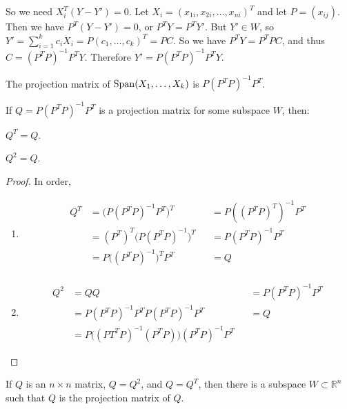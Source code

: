 \documentclass[../main.tex]{subfiles}
\begin{document}
%
{
So we need $X_i^T(Y-Y') = 0$. Let $X_i = (x_{1i},x_{2i},\hdots, x_{ni})^{T}$ and let $P = (x_{ij})$. Then we have $P^T(Y-Y') = 0$, or $P^TY = P^T Y'$. But $Y'\in W$, so $Y' = \sum_{i=1}^{k} c_i X_i = P(c_1,\hdots, c_k)^T = PC$. So we have $P^TY = P^TPC$, and thus $C = (P^TP)^{-1}P^TY$. Therefore $Y'=P(P^TP)^{-1}P^T Y$.
}
%
\begin{definition}
The projection matrix of $\operatorname{Span}(X_{1},\hdots,X_{k})$ is $P(P^TP)^{-1}P^T$.
\end{definition}
%
\begin{theorem}
If $Q = P(P^TP)^{-1}P^T$ is a projection matrix for some subspace $W$, then:
\begin{enumerate}
    \begin{multicols}{2}
        \item $Q^T =Q$.
        \item $Q^2 = Q$.
    \end{multicols}
\end{enumerate}
\end{theorem}
\begin{proof}
In order,
\begin{enumerate}
\item   \begin{align*}
            Q^T &= \big(P(P^TP)^{-1}P^T\big)^T & &= P((P^TP)^T)^{-1}P^T\\
            &= (P^T)^T\big(P(P^TP)^{-1}\big)^T & &= P(P^TP)^{-1}P^T\\
            &= P \big((P^TP)^{-1}\big)^TP^T & &= Q\\
        \end{align*}
\item   \begin{align*}
            Q^2 &= QQ & &=P(P^TP)^{-1}P^T\\
            &= P(P^TP)^{-1}P^T P(P^TP)^{-1}P^T & &= Q\\
            &= P\big((PT^TP)^{-1}(P^TP)\big)(P^TP)^{-1}P^T
        \end{align*}
\end{enumerate}
\end{proof}
%
\begin{theorem}
If $Q$ is an $n\times n$ matrix, $Q = Q^{2}$, and $Q=Q^{T}$, then there is a subspace $W\subset \mathbb{R}^{n}$ such that $Q$ is the projection matrix of $Q$.
\end{theorem}
%
\end{document}
